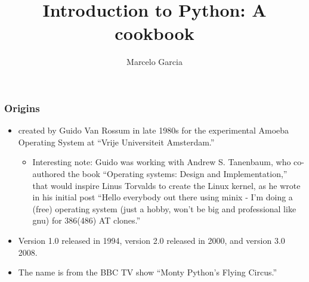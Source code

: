 \documentclass{beamer}
\title{Introduction to Python: A cookbook}
\author{Marcelo Garcia}
\institute{Overleaf}
\date{}
\begin{document}
\frame{\titlepage}

\begin{frame}
\frametitle{Origins}
\begin{itemize}
    \item created by Guido Van Rossum in late 1980s for the experimental Amoeba Operating System at ``Vrije Universiteit Amsterdam.'' 
    \begin{itemize}
        \item Interesting note: Guido was working with Andrew S. Tanenbaum, who co-authored the book ``Operating systems: Design and Implementation,'' that would inspire Linus Torvalds to create the Linux kernel, as he wrote in his initial post ``Hello everybody out there using minix - I'm doing a (free) operating system (just a hobby, won't be big and professional like gnu) for 386(486) AT clones.''
    \end{itemize}
    \item Version 1.0 released in 1994, version 2.0 released in 2000, and version 3.0 2008.
    \item The name is from the BBC TV show ``Monty Python's Flying Circus.''
\end{itemize}
\end{frame}
\end{document}
